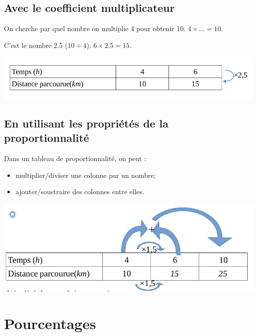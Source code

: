 \documentclass[12pt,a4paper]{article}
\begin{document}
\subsection{Avec le coefficient multiplicateur}

\begin{mymeth}
	On cherche par quel nombre on multiplie 4 pour obtenir 10. $4 \times ...= 10$.
	
	C’est le nombre \num{2.5} ($10 \div 4$). $6 \times \num{2.5} = 15$.
	
	
	\begin{center}
		\includegraphics[scale=0.5]{tab3_3}
	\end{center}
\end{mymeth}


\subsection{En utilisant les propriétés de la proportionnalité}

\begin{myprop}
	Dans un tableau de proportionnalité, on peut :
		\begin{itemize}
			\item multiplier/diviser une colonne par un nombre;
			\item ajouter/soustraire des colonnes entre elles.
		\end{itemize}
	
	\begin{center}
		\includegraphics[scale=0.5]{tab3_4}
	\end{center}
\end{myprop}


\section{Pourcentages}
\end{document}
